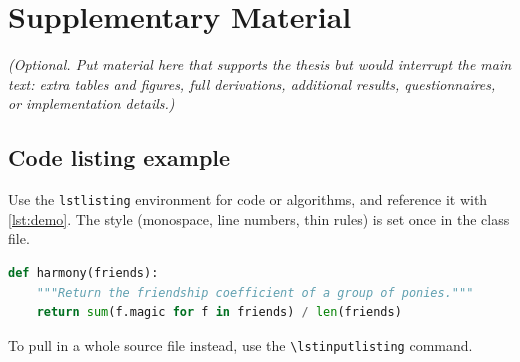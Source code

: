 \chapter{Supplementary Material}
\label{app:results}

\emph{(Optional. Put material here that supports the thesis but would interrupt
the main text: extra tables and figures, full derivations, additional results,
questionnaires, or implementation details.)}

\section{Code listing example}
\label{sec:code-example}

Use the \texttt{lstlisting} environment for code or algorithms, and reference it
with \cref{lst:demo}. The style (monospace, line numbers, thin rules) is set once
in the class file.

\begin{lstlisting}[language=Python,float=ht,
    caption={A minimal example listing.},label={lst:demo}]
def harmony(friends):
    """Return the friendship coefficient of a group of ponies."""
    return sum(f.magic for f in friends) / len(friends)
\end{lstlisting}

To pull in a whole source file instead, use the
\texttt{\textbackslash lstinputlisting} command.
